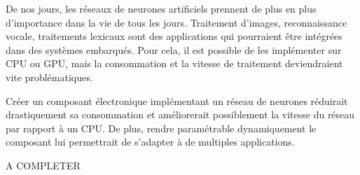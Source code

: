 De nos jours, les réseaux de neurones artificiels prennent de plus en plus d'importance
dans la vie de tous les jours. Traitement d'images, reconnaissance vocale, traitements lexicaux sont
des applications qui pourraient être intégrées dans des systèmes embarqués. Pour cela, il est possible 
de les implémenter sur CPU ou GPU, mais la consommation et la vitesse de traitement deviendraient vite problématiques.

Créer un composant électronique implémentant un réseau de neurones réduirait drastiquement sa consommation
et améliorerait possiblement la vitesse du réseau par rapport à un CPU. De plus, rendre paramétrable dynamiquement le
composant lui permettrait de s'adapter à de multiples applications.

A COMPLETER
